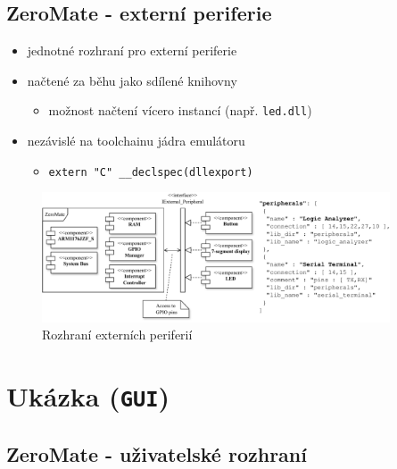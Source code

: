 \documentclass[compress]{beamer}
\begin{document}
\subsection{ZeroMate - externí periferie}

\begin{frame}
	\begin{itemize}
		\item jednotné rozhraní pro externí periferie
		\item načtené za běhu jako sdílené knihovny
		\begin{itemize}
			\item možnost načtení vícero instancí (např. \texttt{led.dll})
		\end{itemize}
		\item nezávislé na toolchainu jádra emulátoru
		\begin{itemize}
			\item \texttt{extern "C" \_\_declspec(dllexport)}
		\end{itemize}
	\end{itemize}
	\vspace{0.0cm}
	\begin{figure}
		\centering
		\hspace{0.4cm}
		\vspace{-0.4cm}
		\includegraphics[width=0.92\textwidth]{img/peripheral_interface_3.pdf}
		\vspace{0.2cm}
		\caption{Rozhraní externích periferií}
	\end{figure}
\end{frame}

\section{Ukázka (\texttt{GUI})}

\subsection{ZeroMate - uživatelské rozhraní}
\end{document}
